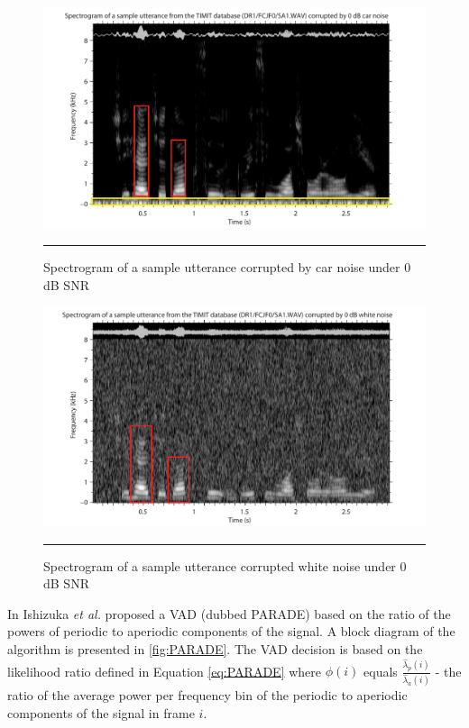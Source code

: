 \begin{figure}[htbp]
	\centering
		\includegraphics[width=0.9\columnwidth]{Figures/Chapter2/harmospgramcar.pdf}
		\rule{37em}{0.5pt}
	\caption[Spectrogram of a sample utterance corrupted by car noise under 0 dB SNR]{Spectrogram of a sample utterance corrupted by car noise under 0 dB SNR}
	\label{fig:harmospgramcar}
\end{figure}

\begin{figure}[htbp]
	\centering
		\includegraphics[width=0.9\columnwidth]{Figures/Chapter2/harmospgramwhite.pdf}
		\rule{37em}{0.5pt}
	\caption[Spectrogram of a sample utterance corrupted by white noise under 0 dB SNR]{Spectrogram of a sample utterance corrupted white noise under 0 dB SNR}
	\label{fig:harmospgramwhite}
\end{figure}

In \cite{PARADE} Ishizuka \emph{et al.} proposed a VAD (dubbed PARADE) based on the ratio of the powers of periodic to aperiodic components of the signal. A block diagram of the algorithm is presented in \ref{fig:PARADE}. The VAD decision is based on the likelihood ratio defined in Equation \ref{eq:PARADE} where $\phi (i)$ equals $\frac{\hat{\lambda}_p (i)}{\hat{\lambda}_a (i)}$ - the ratio of the average power per frequency bin of the periodic to aperiodic components of the signal in frame $i$.

